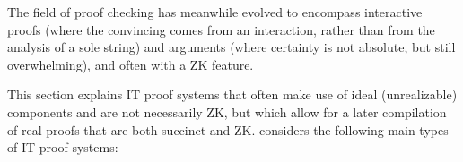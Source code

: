 The field of proof checking has meanwhile evolved to encompass interactive proofs (where the convincing comes from an interaction, rather than from the analysis of a sole string) and arguments (where certainty is not absolute, but still overwhelming), and often with a ZK feature.
\loosen


This section explains IT proof systems that often make use of ideal (unrealizable) components and are not necessarily ZK, but which allow for a later compilation of real proofs that are both succinct and ZK.  
 considers the following main types of IT proof systems:
\loosen
    

